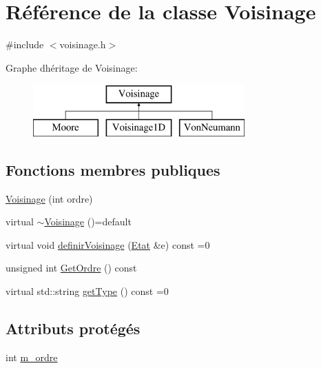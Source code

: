 \hypertarget{class_voisinage}{}\section{Référence de la classe Voisinage}
\label{class_voisinage}


{\ttfamily \#include $<$voisinage.\+h$>$}

Graphe d\textquotesingle{}héritage de Voisinage\+:\begin{figure}[H]
\begin{center}
\leavevmode
\includegraphics[height=2.000000cm]{class_voisinage}
\end{center}
\end{figure}
\subsection*{Fonctions membres publiques}
\begin{DoxyCompactItemize}
\item 
\mbox{\hyperlink{class_voisinage_a9e27105f5e2dcd5e97d2fb86836dd2c5}{Voisinage}} (int ordre)
\item 
virtual \mbox{\hyperlink{class_voisinage_ab96dc57aa577e3c00d9a65b71c538f17}{$\sim$\+Voisinage}} ()=default
\item 
virtual void \mbox{\hyperlink{class_voisinage_ac12f70bf8e971cbc8eaf8394de270d07}{definir\+Voisinage}} (\mbox{\hyperlink{class_etat}{Etat}} \&e) const =0
\item 
unsigned int \mbox{\hyperlink{class_voisinage_a589264908cd4f82538e950eb4659893a}{Get\+Ordre}} () const
\item 
virtual std\+::string \mbox{\hyperlink{class_voisinage_a9853dfde1a68f5bb6333a8db001411a0}{get\+Type}} () const =0
\end{DoxyCompactItemize}
\subsection*{Attributs protégés}
\begin{DoxyCompactItemize}
\item 
int \mbox{\hyperlink{class_voisinage_a336bf2df48d4ee7c8a32c6d583bb10aa}{m\+\_\+ordre}}
\end{DoxyCompactItemize}


